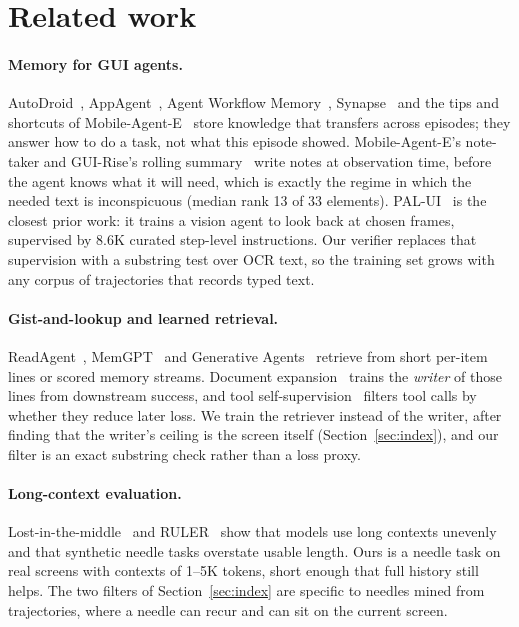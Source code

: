 \section{Related work}

\paragraph{Memory for GUI agents.} AutoDroid~\citep{autodroid}, AppAgent~\citep{appagent}, Agent Workflow Memory~\citep{awm}, Synapse~\citep{synapse} and the tips and shortcuts of Mobile-Agent-E~\citep{mobileagente} store knowledge that transfers across episodes; they answer how to do a task, not what this episode showed. Mobile-Agent-E's note-taker and GUI-Rise's rolling summary~\citep{guirise} write notes at observation time, before the agent knows what it will need, which is exactly the regime in which the needed text is inconspicuous (median rank 13 of 33 elements). PAL-UI~\citep{palui} is the closest prior work: it trains a vision agent to look back at chosen frames, supervised by 8.6K curated step-level instructions. Our verifier replaces that supervision with a substring test over OCR text, so the training set grows with any corpus of trajectories that records typed text.

\paragraph{Gist-and-lookup and learned retrieval.} ReadAgent~\citep{readagent}, MemGPT~\citep{memgpt} and Generative Agents~\citep{generativeagents} retrieve from short per-item lines or scored memory streams. Document expansion~\citep{doc2query} trains the \emph{writer} of those lines from downstream success, and tool self-supervision~\citep{toolformer} filters tool calls by whether they reduce later loss. We train the retriever instead of the writer, after finding that the writer's ceiling is the screen itself (Section~\ref{sec:index}), and our filter is an exact substring check rather than a loss proxy.

\paragraph{Long-context evaluation.} Lost-in-the-middle~\citep{lostmiddle} and RULER~\citep{ruler} show that models use long contexts unevenly and that synthetic needle tasks overstate usable length. Ours is a needle task on real screens with contexts of 1--5K tokens, short enough that full history still helps. The two filters of Section~\ref{sec:index} are specific to needles mined from trajectories, where a needle can recur and can sit on the current screen.
